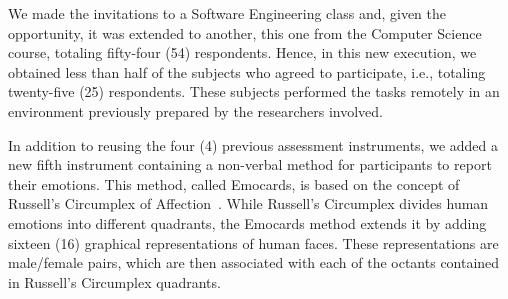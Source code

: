 We made the invitations to a Software Engineering class and, given the opportunity, it was extended to another, this one from the Computer Science course, totaling fifty-four (54) respondents.
Hence, in this new execution, we obtained less than half of the subjects who agreed to participate, i.e., totaling twenty-five (25) respondents.
These subjects performed the tasks remotely in an environment previously prepared by the researchers involved.

In addition to reusing the four (4) previous assessment instruments, we added a new fifth instrument containing a non-verbal method for participants to report their emotions.
This method, called Emocards, is based on the concept of Russell's Circumplex of Affection~\cite{desmet:2001}.
While Russell's Circumplex divides human emotions into different quadrants, the Emocards method extends it by adding sixteen (16) graphical representations of human faces.
These representations are male/female pairs, which are then associated with each of the octants contained in Russell's Circumplex quadrants.

